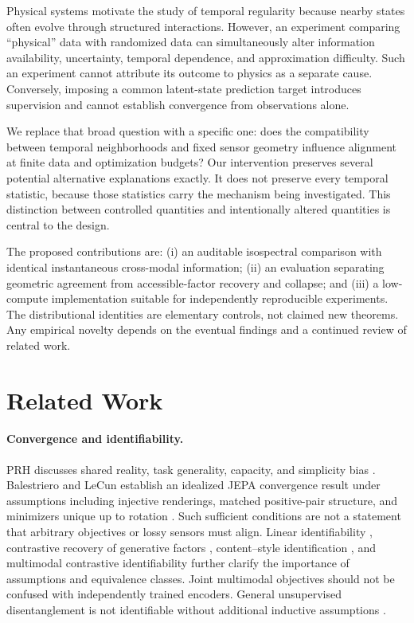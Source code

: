 \documentclass[11pt,a4paper]{article}
\begin{document}
Physical systems motivate the study of temporal regularity because nearby states often evolve through structured interactions. However, an experiment comparing ``physical'' data with randomized data can simultaneously alter information availability, uncertainty, temporal dependence, and approximation difficulty. Such an experiment cannot attribute its outcome to physics as a separate cause. Conversely, imposing a common latent-state prediction target introduces supervision and cannot establish convergence from observations alone.

We replace that broad question with a specific one: does the compatibility between temporal neighborhoods and fixed sensor geometry influence alignment at finite data and optimization budgets? Our intervention preserves several potential alternative explanations exactly. It does not preserve every temporal statistic, because those statistics carry the mechanism being investigated. This distinction between controlled quantities and intentionally altered quantities is central to the design.

The proposed contributions are: (i) an auditable isospectral comparison with identical instantaneous cross-modal information; (ii) an evaluation separating geometric agreement from accessible-factor recovery and collapse; and (iii) a low-compute implementation suitable for independently reproducible experiments. The distributional identities are elementary controls, not claimed new theorems. Any empirical novelty depends on the eventual findings and a continued review of related work.

\section{Related Work}
\paragraph{Convergence and identifiability.}
PRH discusses shared reality, task generality, capacity, and simplicity bias \citep{huh2024}. Balestriero and LeCun establish an idealized JEPA convergence result under assumptions including injective renderings, matched positive-pair structure, and minimizers unique up to rotation \citep{balestriero2026}. Such sufficient conditions are not a statement that arbitrary objectives or lossy sensors must align. Linear identifiability \citep{roeder2021}, contrastive recovery of generative factors \citep{zimmermann2021}, content--style identification \citep{vonkugelgen2021}, and multimodal contrastive identifiability \citep{daunhawer2023} further clarify the importance of assumptions and equivalence classes. Joint multimodal objectives should not be confused with independently trained encoders. General unsupervised disentanglement is not identifiable without additional inductive assumptions \citep{locatello2019}.
\end{document}
